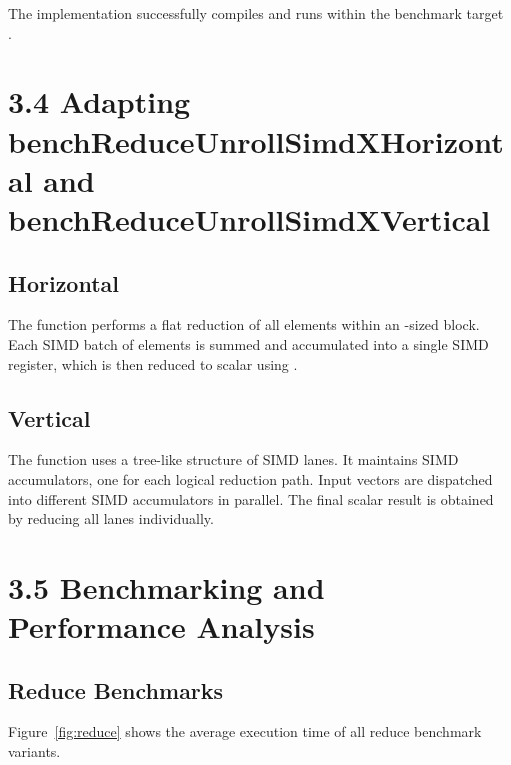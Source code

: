 The implementation successfully compiles and runs within the benchmark target \\
.

\pagebreak

\section*{3.4 Adapting benchReduceUnrollSimdXHorizontal and benchReduceUnrollSimdXVertical}

\subsection*{Horizontal}

The function  performs a flat reduction of all elements within an -sized block.
Each SIMD batch of  elements is summed and accumulated into a single SIMD register, which is then reduced to scalar using .

\subsection*{Vertical}

The function  uses a tree-like structure of SIMD lanes.
It maintains  SIMD accumulators, one for each logical reduction path.
Input vectors are dispatched into different SIMD accumulators in parallel. The final scalar result is obtained by reducing all lanes individually.

\pagebreak

\section*{3.5 Benchmarking and Performance Analysis}

\subsection*{Reduce Benchmarks}

Figure~\ref{fig:reduce} shows the average execution time of all reduce benchmark variants.

